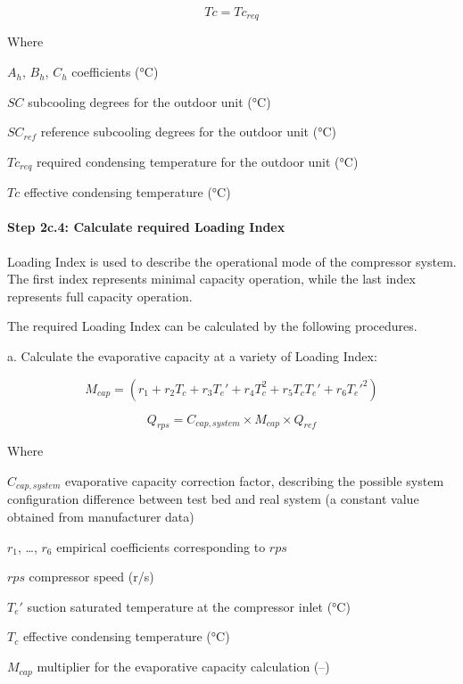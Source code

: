 \begin{equation}Tc=Tc_{req}\end{equation}

Where	

$A_h$, $B_h$, $C_h$ coefficients (°C)

$SC$ subcooling degrees for the outdoor unit (°C)

$SC_{ref}$ reference subcooling degrees for the outdoor unit (°C)

$Tc_{req}$ required condensing temperature for the outdoor unit (°C)

$Tc$ effective condensing temperature (°C)

\paragraph{Step 2c.4: Calculate required Loading Index}\label{step-2c.4:-calculate-required-loading-index}

Loading Index is used to describe the operational mode of the compressor system. The first index represents minimal capacity operation, while the last index represents full capacity operation. 

The required Loading Index can be calculated by the following procedures. 

a. Calculate the evaporative capacity at a variety of Loading Index:

\begin{equation}M_{cap}=(r_1+r_2T_c+r_3{T_e}'+r_4T_c^2+r_5T_c{T_e}'+r_6{T_e}'^2)\end{equation}

\begin{equation}Q_{rps}=C_{cap,system} \times M_{cap} \times Q_{ref} \end{equation}

Where	

$C_{cap,system}$ evaporative capacity correction factor, describing the possible system configuration difference between test bed and real system (a constant value obtained from manufacturer data)  

$r_1$, \ldots, $r_6$ empirical coefficients corresponding to $rps$  

$rps$	compressor speed (r/s) 

${T_e}'$ suction saturated temperature at the compressor inlet (°C)

$T_c$	effective condensing temperature (°C)

$M_{cap}$	multiplier for the evaporative capacity calculation (--)

